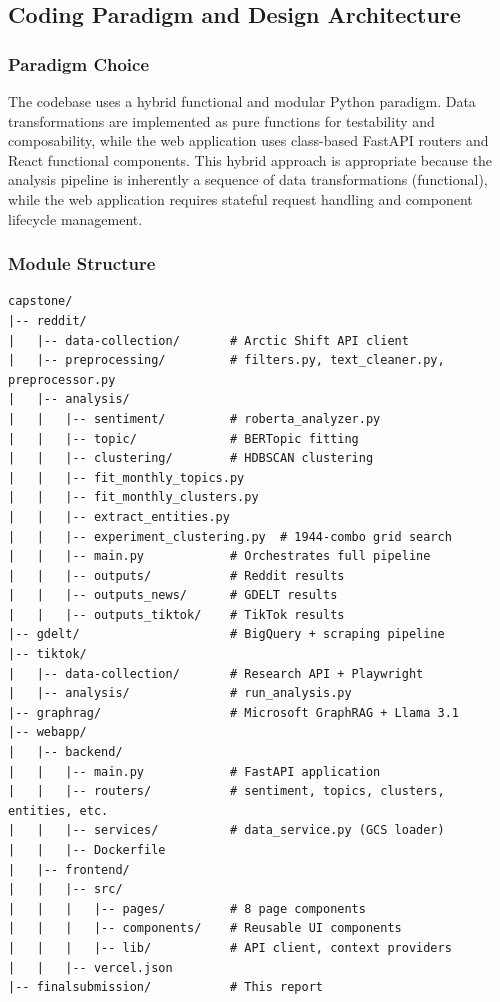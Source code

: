 \documentclass[12pt, letterpaper]{article}
\begin{document}
\subsection{Coding Paradigm and Design Architecture}

\subsubsection{Paradigm Choice}
The codebase uses a hybrid functional and modular Python paradigm. Data transformations are implemented as pure functions for testability and composability, while the web application uses class-based FastAPI routers and React functional components. This hybrid approach is appropriate because the analysis pipeline is inherently a sequence of data transformations (functional), while the web application requires stateful request handling and component lifecycle management.

\subsubsection{Module Structure}
\begin{lstlisting}[caption={Repository directory structure}, label=lst:structure]
capstone/
|-- reddit/
|   |-- data-collection/       # Arctic Shift API client
|   |-- preprocessing/         # filters.py, text_cleaner.py, preprocessor.py
|   |-- analysis/
|   |   |-- sentiment/         # roberta_analyzer.py
|   |   |-- topic/             # BERTopic fitting
|   |   |-- clustering/        # HDBSCAN clustering
|   |   |-- fit_monthly_topics.py
|   |   |-- fit_monthly_clusters.py
|   |   |-- extract_entities.py
|   |   |-- experiment_clustering.py  # 1944-combo grid search
|   |   |-- main.py            # Orchestrates full pipeline
|   |   |-- outputs/           # Reddit results
|   |   |-- outputs_news/      # GDELT results
|   |   |-- outputs_tiktok/    # TikTok results
|-- gdelt/                     # BigQuery + scraping pipeline
|-- tiktok/
|   |-- data-collection/       # Research API + Playwright
|   |-- analysis/              # run_analysis.py
|-- graphrag/                  # Microsoft GraphRAG + Llama 3.1
|-- webapp/
|   |-- backend/
|   |   |-- main.py            # FastAPI application
|   |   |-- routers/           # sentiment, topics, clusters, entities, etc.
|   |   |-- services/          # data_service.py (GCS loader)
|   |   |-- Dockerfile
|   |-- frontend/
|   |   |-- src/
|   |   |   |-- pages/         # 8 page components
|   |   |   |-- components/    # Reusable UI components
|   |   |   |-- lib/           # API client, context providers
|   |   |-- vercel.json
|-- finalsubmission/           # This report
\end{lstlisting}
\end{document}
